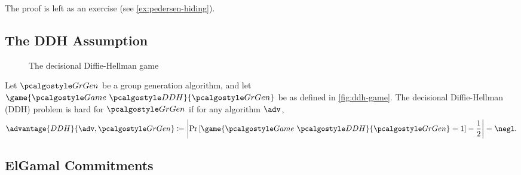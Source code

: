The proof is left as an exercise (see \autoref{ex:pedersen-hiding}).

\subsection{The DDH Assumption}

\begin{figure}[tbhp]
  \begin{center}
    \begin{tcolorbox}[width=6cm]
      \begin{pchstack}[center]
      \end{pchstack}
    \end{tcolorbox}
  \end{center}
  \caption{The decisional Diffie-Hellman game\label{fig:ddh-game}}
\end{figure}

\begin{definition}
  Let $\grgen$ be a group generation algorithm, and let $\game{\Game~\algo{DDH}}{\grgen}$ be as defined in \autoref{fig:ddh-game}.
  The decisional Diffie-Hellman (DDH) problem is hard for $\grgen$ if for any \ppt algorithm $\adv$,
  \[
  \advantage{DDH}{\adv, \grgen} \defeq \left|\pr{\game{\Game~\algo{DDH}}{\grgen} = 1} - \frac{1}{2}\right| = \negl.
  \]
\end{definition}

\subsection{ElGamal Commitments}

